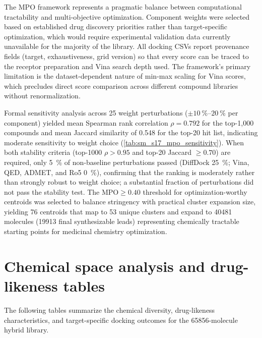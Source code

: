 \documentclass[journal=jcisd8,manuscript=suppinfo]{achemso}
\begin{document}
The MPO framework represents a pragmatic balance between computational tractability and multi-objective optimization. Component weights were selected based on established drug discovery priorities \cite{Hughes2008, Lipinski2004} rather than target-specific optimization, which would require experimental validation data currently unavailable for the majority of the library. All docking CSVs report provenance fields (target, exhaustiveness, grid version) so that every score can be traced to the receptor preparation and Vina search depth used. The framework's primary limitation is the dataset-dependent nature of min-max scaling for Vina scores, which precludes direct score comparison across different compound libraries without renormalization.

 Formal sensitivity analysis across \num{25} weight perturbations ($\pm \qtyrange{10}{20}{\percent}$ per component) yielded mean Spearman rank correlation $\rho = \num{0.792}$ for the top-1,000 compounds and mean Jaccard similarity of \num{0.548} for the top-20 hit list, indicating moderate sensitivity to weight choice (\cref{tab:sm_s17_mpo_sensitivity}). When both stability criteria (top-1000 $\rho > \num{0.95}$ and top-20 Jaccard $\geq \num{0.70}$) are required, only \qty{5}{\percent} of non-baseline perturbations passed (DiffDock \qty{25}{\percent}; Vina, QED, ADMET, and Ro5 \qty{0}{\percent}), confirming that the ranking is moderately rather than strongly robust to weight choice; a substantial fraction of perturbations did not pass the stability test. The $\text{MPO} \geq \num{0.40}$ threshold for optimization-worthy centroids was selected to balance stringency with practical cluster expansion size, yielding \num{76} centroids that map to \num{53} unique clusters and expand to \num{40481} molecules (\num{19913} final synthesizable leads) representing chemically tractable starting points for medicinal chemistry optimization.

\clearpage

\section*{Chemical space analysis and drug-likeness tables}

The following tables summarize the chemical diversity, drug-likeness characteristics, and target-specific docking outcomes for the \num{65856}-molecule hybrid library.
\end{document}
